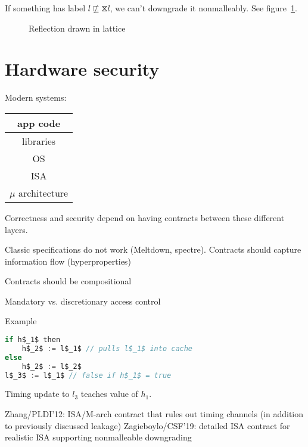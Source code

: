 \documentclass{article}
\newcommand{\refl}{\hourglass}
\begin{document}
If something has label $l \not\sqsubseteq \refl l$, we can't downgrade it nonmalleably. See figure~\ref{fig4}.


\begin{figure}[ht!]
\label{fig4}
\caption{Reflection drawn in lattice}
\end{figure}

\section{Hardware security}
Modern systems:
\begin{tabular}{|c|}
\hline
app code \\
\hline
libraries \\ 
\hline
OS \\
\hline
ISA \\ 
\hline
$\mu$ architecture \\
\hline
\end{tabular}

Correctness and security depend on having contracts between these different layers. 

Classic specifications do not work (Meltdown, spectre). Contracts should capture information flow (hyperproperties)

Contracts should be compositional

Mandatory vs. discretionary access control

Example
\begin{lstlisting}[mathescape,frame=single,basicstyle=\ttfamily,language=java]
if h$_1$ then
    h$_2$ := l$_1$ // pulls l$_1$ into cache
else 
    h$_2$ := l$_2$
l$_3$ := l$_1$ // false if h$_1$ = true
\end{lstlisting}

Timing update to $l_3$ teaches value of $h_1$.

Zhang/PLDI'12: ISA/M-arch contract that rules out timing channels (in addition to previously discussed leakage)
Zagieboylo/CSF'19: detailed ISA contract for realistic ISA supporting nonmalleable downgrading
\end{document}
